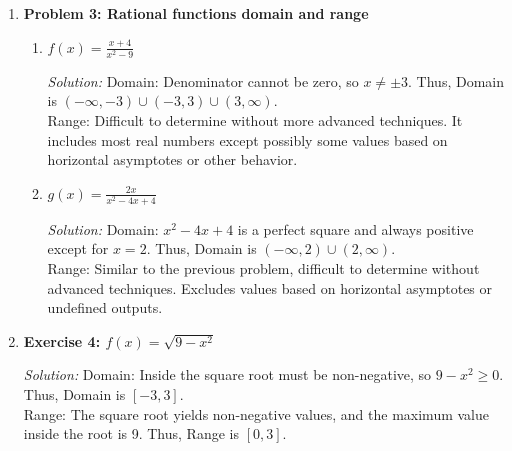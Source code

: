 \documentclass[a4paper,12pt]{book}
\newcounter{problem}
\newenvironment{solution}[1][]
{\par\noindent\textit{Solution:} \rmfamily}{\medskip}
\begin{document}
\begin{enumerate}
\begin{enumerate}[label=(\alph*)]
        \item \( g(x) = \frac{1}{x^2} \)
        \begin{solution}
        Domain: \( x \neq 0 \) since the denominator cannot be zero. Thus, Domain is \( (-\infty, 0) \cup (0, \infty) \).\\
        Range: Output is always positive. Thus, Range is \( (0, \infty) \).
        \end{solution}

        \item \( h(x) = |x + 3| \)
        \begin{solution}
        Domain: \( \mathbb{R} \) since absolute value is defined for all real numbers.\\
        Range: Absolute value outputs are non-negative. Thus, Range is \( [0, \infty) \).
        \end{solution}
    \end{enumerate}

    \item \textbf{Problem 3: Rational functions domain and range}
    \begin{enumerate}[label=(\alph*)]
        \item \( f(x) = \frac{x + 4}{x^2 - 9} \)
        \begin{solution}
        Domain: Denominator cannot be zero, so \( x \neq \pm 3 \). Thus, Domain is \( (-\infty, -3) \cup (-3, 3) \cup (3, \infty) \).\\
        Range: Difficult to determine without more advanced techniques. It includes most real numbers except possibly some values based on horizontal asymptotes or other behavior.
        \end{solution}

        \item \( g(x) = \frac{2x}{x^2 - 4x + 4} \)
        \begin{solution}
        Domain: \( x^2 - 4x + 4 \) is a perfect square and always positive except for \( x = 2 \). Thus, Domain is \( (-\infty, 2) \cup (2, \infty) \).\\
        Range: Similar to the previous problem, difficult to determine without advanced techniques. Excludes values based on horizontal asymptotes or undefined outputs.
        \end{solution}
    \end{enumerate}

    \item \textbf{Exercise 4: \( f(x) = \sqrt{9 - x^2} \)}
    \begin{solution}
    Domain: Inside the square root must be non-negative, so \( 9 - x^2 \geq 0 \). Thus, Domain is \( [-3, 3] \).\\
    Range: The square root yields non-negative values, and the maximum value inside the root is 9. Thus, Range is \( [0, 3] \).
    \end{solution}


\end{enumerate}
\end{document}
